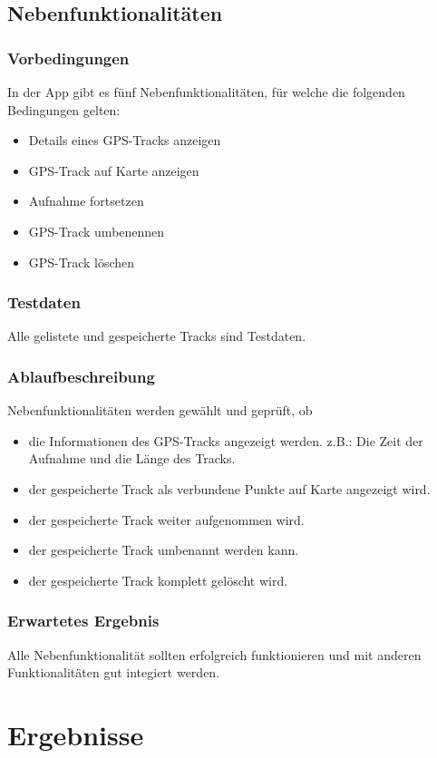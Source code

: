 \documentclass{article}
\begin{document}
\subsection{Nebenfunktionalitäten}
\subsubsection{Vorbedingungen}
	In der App gibt es fünf Nebenfunktionalitäten, für welche die folgenden Bedingungen gelten:
	\begin{itemize}
		\item Details eines GPS-Tracks anzeigen
		\item GPS-Track auf Karte anzeigen	
		\item Aufnahme fortsetzen
		\item GPS-Track umbenennen
		\item GPS-Track löschen	
	\end{itemize}
\subsubsection{Testdaten}
	Alle gelistete und gespeicherte Tracks sind Testdaten.
\subsubsection{Ablaufbeschreibung}
	Nebenfunktionalitäten werden gewählt und geprüft, ob
		\begin{itemize}
			\item die Informationen des GPS-Tracks angezeigt werden. z.B.: Die Zeit der Aufnahme und die Länge des Tracks.
			\item der gespeicherte Track als verbundene Punkte auf Karte angezeigt wird.
			\item der gespeicherte Track weiter aufgenommen wird.
			\item der gespeicherte Track umbenannt werden kann.
			\item der gespeicherte Track komplett gelöscht wird.
		\end{itemize}
\subsubsection{Erwartetes Ergebnis}
	Alle Nebenfunktionalität sollten erfolgreich funktionieren und mit anderen Funktionalitäten gut integiert werden.

\section{Ergebnisse}
\end{document}

